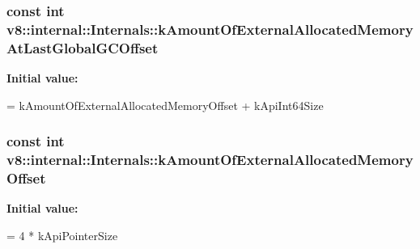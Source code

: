 \subsubsection[{\texorpdfstring{k\+Amount\+Of\+External\+Allocated\+Memory\+At\+Last\+Global\+G\+C\+Offset}{kAmountOfExternalAllocatedMemoryAtLastGlobalGCOffset}}]{\setlength{\rightskip}{0pt plus 5cm}const int v8\+::internal\+::\+Internals\+::k\+Amount\+Of\+External\+Allocated\+Memory\+At\+Last\+Global\+G\+C\+Offset\hspace{0.3cm}{\ttfamily [static]}}\hypertarget{classv8_1_1internal_1_1_internals_a4839a352b8fc929d6f05028abe0db272}{}\label{classv8_1_1internal_1_1_internals_a4839a352b8fc929d6f05028abe0db272}
{\bfseries Initial value\+:}
\begin{DoxyCode}
=
      kAmountOfExternalAllocatedMemoryOffset + kApiInt64Size
\end{DoxyCode}
\subsubsection[{\texorpdfstring{k\+Amount\+Of\+External\+Allocated\+Memory\+Offset}{kAmountOfExternalAllocatedMemoryOffset}}]{\setlength{\rightskip}{0pt plus 5cm}const int v8\+::internal\+::\+Internals\+::k\+Amount\+Of\+External\+Allocated\+Memory\+Offset\hspace{0.3cm}{\ttfamily [static]}}\hypertarget{classv8_1_1internal_1_1_internals_a715b5e2c414c5efd35c5e01d4f2b9f85}{}\label{classv8_1_1internal_1_1_internals_a715b5e2c414c5efd35c5e01d4f2b9f85}
{\bfseries Initial value\+:}
\begin{DoxyCode}
=
      4 * kApiPointerSize
\end{DoxyCode}
